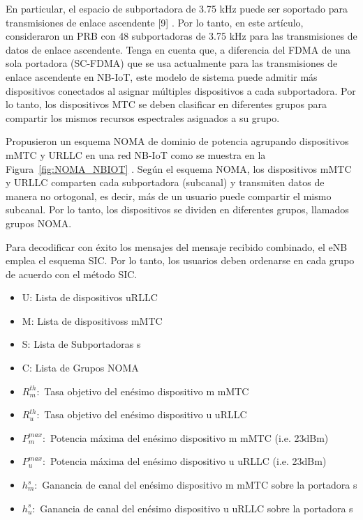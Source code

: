 En particular, el espacio de subportadora de 3.75 kHz puede ser soportado para transmisiones de enlace ascendente [9] . Por lo tanto, en este artículo, consideraron un PRB con 48 subportadoras de 3.75 kHz para las transmisiones de datos de enlace ascendente. Tenga en cuenta que, a diferencia del FDMA de una sola portadora (SC-FDMA) que se usa actualmente para las transmisiones de enlace ascendente en NB-IoT, este modelo de sistema puede admitir más dispositivos conectados al asignar múltiples dispositivos a cada subportadora. Por lo tanto, los dispositivos MTC se deben clasificar en diferentes grupos para compartir los mismos recursos espectrales asignados a su grupo.\newline

Propusieron un esquema NOMA de dominio de potencia agrupando dispositivos mMTC y URLLC en una red NB-IoT como se muestra en la Figura~\ref{fig:NOMA_NBIOT} . Según el esquema NOMA, los dispositivos mMTC y URLLC comparten cada subportadora (subcanal) y transmiten datos de manera no ortogonal, es decir, más de un usuario puede compartir el mismo subcanal. Por lo tanto, los dispositivos se dividen en diferentes grupos, llamados grupos NOMA.\newline

Para decodificar con éxito los mensajes del mensaje recibido combinado, el eNB emplea el esquema SIC. Por lo tanto, los usuarios deben ordenarse en cada grupo de acuerdo con el método SIC.\newline

\begin{itemize}
  \item U: Lista de dispositivos uRLLC
  \item M: Lista de dispositivoss mMTC
  \item S: Lista de Subportadoras s
  \item C: Lista de Grupos NOMA
  \item $R_{m}^{th}:$ Tasa objetivo del enésimo dispositivo m mMTC 
  \item $R_{u}^{th}:$ Tasa objetivo del enésimo dispositivo u uRLLC
  \item $P_{m}^{max}:$ Potencia máxima del enésimo dispositivo m mMTC (i.e. 23dBm)
  \item $P_{u}^{max}:$ Potencia máxima del enésimo dispositivo u uRLLC (i.e. 23dBm)
  \item $h_{m}^{s}:$ Ganancia de canal del enésimo dispositivo m mMTC sobre la portadora s
  \item $h_{u}^{s}:$ Ganancia de canal del enésimo dispositivo u uRLLC sobre la portadora s
\end{itemize}

